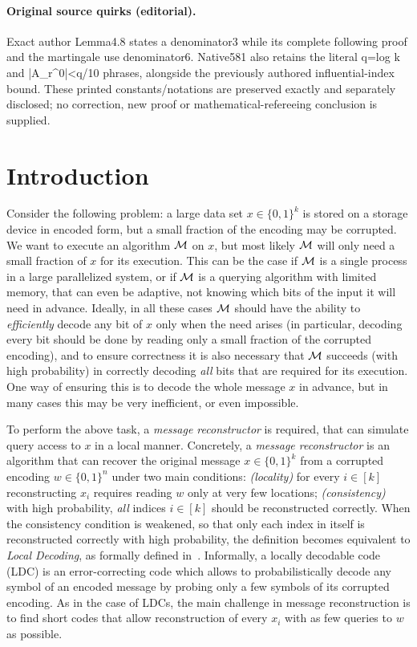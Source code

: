 \documentclass[10pt]{article}
\theoremstyle{definition}
\numberwithin{equation}{section}
\newcommand{\MM}{{\cal M}}
\newcommand{\zo}{{\{0,1\}}}
\begin{document}
\paragraph{Original source quirks (editorial).} Exact author Lemma4.8 states a denominator3 while its complete following proof and the martingale use denominator6. Native581 also retains the literal q=log k and |A\_r\textasciicircum{}0|<q/10 phrases, alongside the previously authored influential-index bound. These printed constants/notations are preserved exactly and separately disclosed; no correction, new proof or mathematical-refereeing conclusion is supplied.
\clearpage

\section{Introduction}

Consider the following problem: a large data set $x \in \zo^k$ is stored on a
storage device in encoded form, but a small fraction of the encoding
may be corrupted. We want to execute an algorithm $\MM$ on $x$, but most likely $\MM$ will only need a
small fraction of $x$ for its execution. This can be the case if $\MM$ is a single process in a large parallelized system, or if $\MM$ is a querying algorithm with limited memory, that can even be adaptive, not knowing which bits of the input it will need in advance.
Ideally, in all these cases $\MM$ should have the ability to \emph{efficiently} decode any bit of $x$ only when the need arises (in particular, decoding every bit should be done by reading only a small fraction of the corrupted encoding), and to ensure correctness it is also necessary that $\MM$
succeeds (with high probability) in correctly decoding \emph{all} bits that are
 required for its execution.
One way of ensuring this is to decode the whole message $x$ in advance, but in many cases this may be very inefficient, or even impossible.

To perform the above task, a \emph{message reconstructor} is required, that can simulate query access to $x$ in a local manner. Concretely, a \emph{message reconstructor} is an algorithm that can recover the original
message $x\in \zo^k$ from a corrupted encoding $w \in \zo^n$ under two main conditions: \emph{(locality)} for every $i \in [k]$ reconstructing $x_i$ requires reading $w$ only at very few locations; \emph{(consistency)} with high probability, \emph{all} indices $i \in [k]$ should be reconstructed correctly.
When the consistency condition is weakened, so that only each index
in itself is reconstructed correctly with high probability, the
definition becomes equivalent to \emph{Local Decoding}, as formally defined in~\cite{katz-trevisan}.
Informally, a locally decodable code (LDC) is an error-correcting code which allows to probabilistically decode any
symbol of an encoded message by probing only a few symbols of its corrupted encoding.
As in the case of LDCs, the main challenge in message reconstruction is to find short codes that allow reconstruction of every $x_i$ with as few queries to $w$ as possible.
\end{document}
